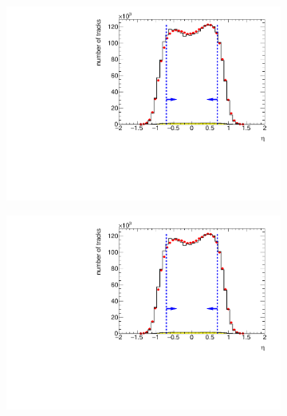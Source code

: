 \begin{figure}[h!]
	\vspace{-1cm}
	\centering
	\begin{subfigure}{.45\textwidth}
		\includegraphics[width=\textwidth, page=2]{chapters/chrgSTAR/img/selection/SDT.pdf}
		\caption{}
	\end{subfigure}
	\begin{subfigure}{.45\textwidth}
		\includegraphics[width=\textwidth, page=3]{chapters/chrgSTAR/img/selection/SDT.pdf}
		\caption{}
	\end{subfigure}
	\begin{subfigure}{.45\textwidth}

\end{subfigure}
\end{figure}
